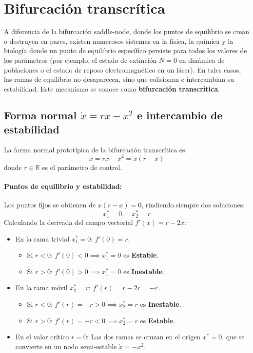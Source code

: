 \section{Bifurcación transcrítica}
\label{sec:transcritica}

A diferencia de la bifurcación saddle-node, donde los puntos de equilibrio se crean o destruyen en pares, existen numerosos sistemas en la física, la química y la biología donde un punto de equilibrio específico persiste para todos los valores de los parámetros (por ejemplo, el estado de extinción $N=0$ en dinámica de poblaciones o el estado de reposo electromagnético en un láser). En tales casos, las ramas de equilibrio no desaparecen, sino que colisionan e intercambian su estabilidad. Este mecanismo se conoce como \textbf{bifurcación transcrítica}.

\subsection{Forma normal $\dot{x} = rx - x^{2}$ e intercambio de estabilidad}

La forma normal prototípica de la bifurcación transcrítica es:
\begin{equation}
    \dot{x} = rx - x^2 = x(r - x)
    \label{eq:transcritica_forma_normal}
\end{equation}
donde $r \in \mathbb{R}$ es el parámetro de control.

\paragraph{Puntos de equilibrio y estabilidad:}
Los puntos fijos se obtienen de $x(r - x) = 0$, rindiendo siempre dos soluciones:
\begin{equation}
    x_1^* = 0, \quad x_2^* = r
\end{equation}
Calculando la derivada del campo vectorial $f'(x) = r - 2x$:
\begin{itemize}
    \item En la rama trivial $x_1^* = 0$: $f'(0) = r$.
    \begin{itemize}
        \item Si $r < 0$: $f'(0) < 0 \implies x_1^* = 0$ es \textbf{Estable}.
        \item Si $r > 0$: $f'(0) > 0 \implies x_1^* = 0$ es \textbf{Inestable}.
    \end{itemize}
    \item En la rama móvil $x_2^* = r$: $f'(r) = r - 2r = -r$.
    \begin{itemize}
        \item Si $r < 0$: $f'(r) = -r > 0 \implies x_2^* = r$ es \textbf{Inestable}.
        \item Si $r > 0$: $f'(r) = -r < 0 \implies x_2^* = r$ es \textbf{Estable}.
    \end{itemize}
    \item En el valor crítico $r = 0$: Las dos ramas se cruzan en el origen $x^* = 0$, que se convierte en un nodo semi-estable $\dot{x} = -x^2$.
\end{itemize}

